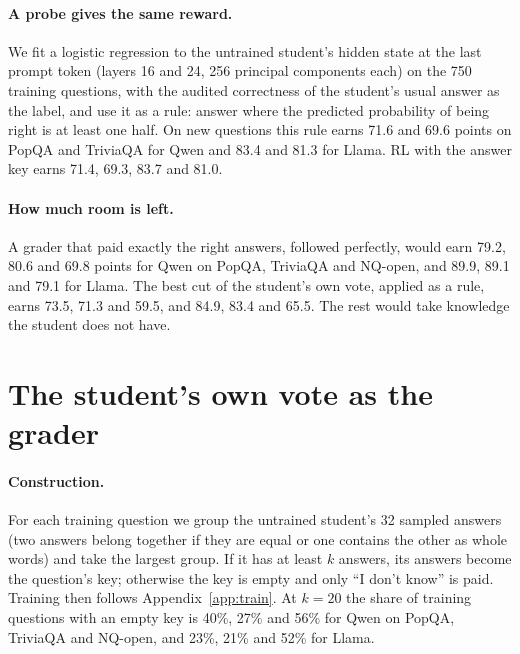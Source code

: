 \documentclass[11pt,a4paper,twocolumn]{article}
\newcommand{\idk}{``I don't know''}
\begin{document}
\paragraph{A probe gives the same reward.} We fit a logistic regression to the untrained student's hidden state at the last prompt token (layers 16 and 24, 256 principal components each) on the 750 training questions, with the audited correctness of the student's usual answer as the label, and use it as a rule: answer where the predicted probability of being right is at least one half. On new questions this rule earns 71.6 and 69.6 points on PopQA and TriviaQA for Qwen and 83.4 and 81.3 for Llama. RL with the answer key earns 71.4, 69.3, 83.7 and 81.0.

\paragraph{How much room is left.} A grader that paid exactly the right answers, followed perfectly, would earn 79.2, 80.6 and 69.8 points for Qwen on PopQA, TriviaQA and NQ-open, and 89.9, 89.1 and 79.1 for Llama. The best cut of the student's own vote, applied as a rule, earns 73.5, 71.3 and 59.5, and 84.9, 83.4 and 65.5. The rest would take knowledge the student does not have.

\section{The student's own vote as the grader}
\label{app:own}

\paragraph{Construction.} For each training question we group the untrained student's 32 sampled answers (two answers belong together if they are equal or one contains the other as whole words) and take the largest group. If it has at least $k$ answers, its answers become the question's key; otherwise the key is empty and only \idk{} is paid. Training then follows Appendix~\ref{app:train}. At $k = 20$ the share of training questions with an empty key is 40\%, 27\% and 56\% for Qwen on PopQA, TriviaQA and NQ-open, and 23\%, 21\% and 52\% for Llama.
\end{document}

